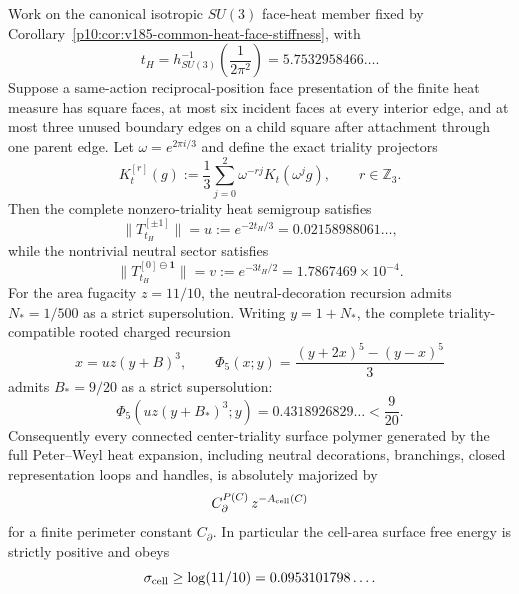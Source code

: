 \documentclass[12pt,a4paper]{article}
\begin{document}
\begin{theorem}
\label{p10:thm:v2155-triality-branch-core-majorant}
Work on the canonical isotropic \(SU(3)\) face-heat member fixed by
Corollary~\ref{p10:cor:v185-common-heat-face-stiffness}, with
\[
 t_H=h_{SU(3)}^{-1}\!\left(\frac1{2\pi^2}\right)
 =5.7532958466\ldots .
\]
Suppose a same-action reciprocal-position face presentation of the finite heat
measure has square faces, at most six incident faces at every interior edge,
and at most three unused boundary edges on a child square after attachment
through one parent edge.  Let \(\omega=e^{2\pi i/3}\) and define the exact
triality projectors
\[
 K_t^{[r]}(g):=\frac13\sum_{j=0}^{2}\omega^{-rj}K_t(\omega^jg),
 \qquad r\in\mathbb Z_3.
\]
Then the complete nonzero-triality heat semigroup satisfies
\[
 \bigl\|T_{t_H}^{[\pm1]}\bigr\|
 =u:=e^{-2t_H/3}=0.02158988061\ldots,
\]
while the nontrivial neutral sector satisfies
\[
 \bigl\|T_{t_H}^{[0]\ominus\mathbf1}\bigr\|
 =v:=e^{-3t_H/2}=1.7867469\times10^{-4}.
\]
For the area fugacity \(z=11/10\), the neutral-decoration recursion admits
\(N_*=1/500\) as a strict supersolution.  Writing \(y=1+N_*\), the complete
triality-compatible rooted charged recursion
\[
 x=uz(y+B)^3,
 \qquad
 \Phi_5(x;y)=\frac{(y+2x)^5-(y-x)^5}{3}
\]
admits \(B_*=9/20\) as a strict supersolution:
\[
 \Phi_5\!\left(uz(y+B_*)^3;y\right)
 =0.4318926829\ldots <\frac9{20}.
\]
Consequently every connected center-triality surface polymer generated by the
full Peter--Weyl heat expansion, including neutral decorations, branchings,
closed representation loops and handles, is absolutely majorized by
\[
 C_\partial^{P(C)}\,z^{-A_{\rm cell}(C)}
\]
for a finite perimeter constant \(C_\partial\).  In particular the cell-area
surface free energy is strictly positive and obeys
\[
 \sigma_{\rm cell}\ge\log(11/10)=0.0953101798\ldots .
\]
\end{theorem}
\end{document}
